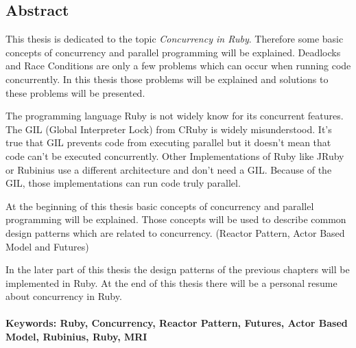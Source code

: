 \subsection*{Abstract}

This thesis is dedicated to the topic \emph{Concurrency in Ruby}. Therefore some basic concepts of concurrency and parallel programming will be explained. Deadlocks and Race Conditions are only a few problems which can occur when running code concurrently. In this thesis those problems will be explained and solutions to these problems will be presented. 

The programming language Ruby is not widely know for its concurrent features. The GIL (Global Interpreter Lock) from CRuby is widely misunderstood. It's true that GIL prevents code from executing parallel but it doesn't mean that code can't be executed concurrently. Other Implementations of Ruby like JRuby or Rubinius use a different architecture and don't need a GIL. Because of the GIL, those implementations can run code truly parallel.

At the beginning of this thesis basic concepts of concurrency and parallel programming will be explained. Those concepts will be used to describe common design patterns which are related to concurrency. (Reactor Pattern, Actor Based Model and Futures)

In the later part of this thesis the design patterns of the previous chapters will be implemented in Ruby. At the end of this thesis there will be a personal resume about concurrency in Ruby.

\paragraph{Keywords:  Ruby, Concurrency, Reactor Pattern, Futures, Actor Based Model, Rubinius, Ruby, MRI}


